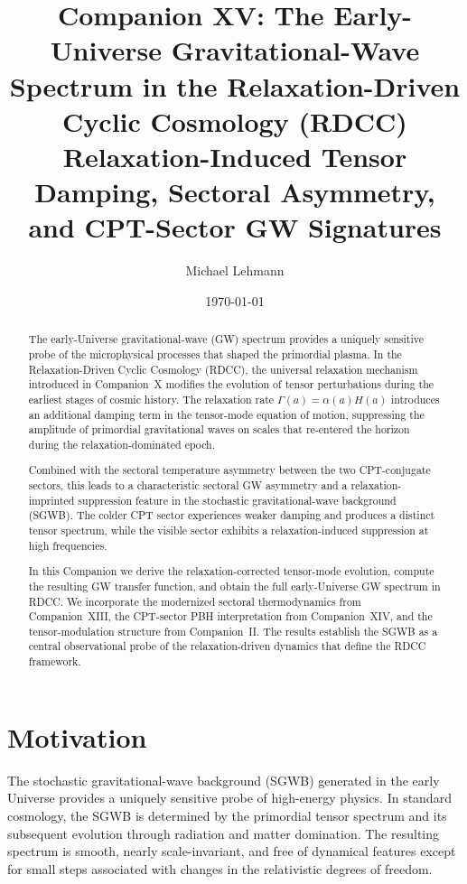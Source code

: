 \documentclass[11pt,a4paper]{article}
\title{\textbf{Companion XV: The Early-Universe Gravitational-Wave Spectrum in the Relaxation-Driven Cyclic Cosmology (RDCC)}\\[2mm]
\textbf{Relaxation-Induced Tensor Damping, Sectoral Asymmetry, and CPT-Sector GW Signatures}}
\author[1]{Michael Lehmann}
\affil[1]{\small Independent Researcher, Relaxation-Driven Cyclic Cosmology (RDCC) Framework\\
\texttt{mi.lehmann@gmx.de}}
\date{\small \today}
\begin{document}
\maketitle

\begin{abstract}
The early-Universe gravitational-wave (GW) spectrum provides a uniquely sensitive probe of
the microphysical processes that shaped the primordial plasma. In the Relaxation-Driven Cyclic
Cosmology (RDCC), the universal relaxation mechanism introduced in Companion~X modifies
the evolution of tensor perturbations during the earliest stages of cosmic history. The relaxation
rate $\Gamma(a) = \alpha(a) H(a)$ introduces an additional damping term in the tensor-mode
equation of motion, suppressing the amplitude of primordial gravitational waves on scales that
re-entered the horizon during the relaxation-dominated epoch.

Combined with the sectoral temperature asymmetry between the two CPT-conjugate sectors,
this leads to a characteristic sectoral GW asymmetry and a relaxation-imprinted suppression
feature in the stochastic gravitational-wave background (SGWB). The colder CPT sector
experiences weaker damping and produces a distinct tensor spectrum, while the visible sector
exhibits a relaxation-induced suppression at high frequencies.

In this Companion we derive the relaxation-corrected tensor-mode evolution, compute the
resulting GW transfer function, and obtain the full early-Universe GW spectrum in RDCC. We
incorporate the modernized sectoral thermodynamics from Companion~XIII, the CPT-sector PBH
interpretation from Companion~XIV, and the tensor-modulation structure from Companion~II.
The results establish the SGWB as a central observational probe of the relaxation-driven
dynamics that define the RDCC framework.
\end{abstract}


\section{Motivation}

The stochastic gravitational-wave background (SGWB) generated in the early Universe provides
a uniquely sensitive probe of high-energy physics. In standard cosmology, the SGWB is
determined by the primordial tensor spectrum and its subsequent evolution through radiation
and matter domination. The resulting spectrum is smooth, nearly scale-invariant, and free of
dynamical features except for small steps associated with changes in the relativistic degrees of
freedom.
\end{document}
